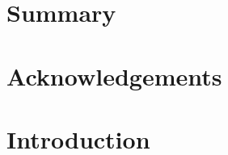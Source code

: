 \documentclass[10pt,a4paper,twoside]{article}
\begin{document}
\section{Summary}
\setcounter{page}{1}

\vfill
\newpage

\setcounter{tocdepth}{3}
\tableofcontents



\vfill
\newpage

\section{Acknowledgements}

\vfill
\newpage

\section{Introduction}
 
\end{document}
